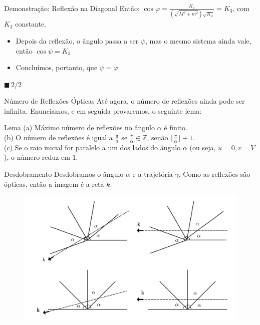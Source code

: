 \documentclass{beamer}
\begin{document}
\begin{frame}{Demonstração: Reflexão na Diagonal}
  Então:
  $\cos{\varphi} = \frac{K_1}{(\sqrt{M^2+m^2}) \sqrt{K_2}} = K_3$, com $K_3$ constante.
  \begin{itemize}
    \item Depois da reflexão, o ângulo passa a ser $\psi$, mas o mesmo sistema ainda vale, então $\cos{\psi} = K_3$
    \item Concluímos, portanto, que $\psi = \varphi$
  \end{itemize}
  $\blacksquare \, 2/2$
\end{frame}

\begin{frame}{Número de Reflexões Ópticas}
  Até agora, o número de reflexões ainda pode ser infinita. 
  Enunciamos, e em seguida provaremos, o seguinte lema:
  \begin{block}{Lema}
    (a) Máximo número de reflexões no ângulo $\alpha$ é finito.\\
    (b) O número de reflexões é igual a $\frac{\pi}{\alpha}$ se $\frac{\pi}{\alpha}\in\mathbb Z$, senão $\lfloor\frac{\pi}{\alpha}\rfloor+1$.\\
    (c) Se o raio inicial for paralelo a um dos lados do ângulo $\alpha$ (ou seja, $u=0,v=V$), o número reduz em 1.
  \end{block}
\end{frame}

\begin{frame}{Desdobramento}
  Desdobramos o ângulo $\alpha$ e a trajetória $\gamma$. Como as reflexões são ópticas, então a imagem é a reta $k$.
  \begin{figure}
    \centering
    \includegraphics[width=1\textwidth]{images/image-5.png}
  \end{figure}
\end{frame}
\end{document}
